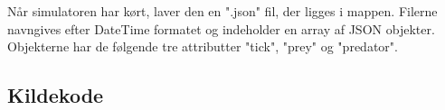 \documentclass[a4paper]{article}
\begin{document}
        Når simulatoren har kørt, laver den en ".json" fil, der ligges i  mappen.
        Filerne navngives efter DateTime formatet og indeholder en array af JSON objekter.
        Objekterne har de følgende tre attributter "tick", "prey" og "predator".

      \subsection{Kildekode} \label{ssec:sourceCode}
        
        
        
\end{document}
